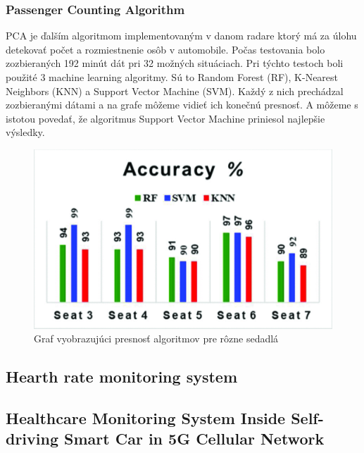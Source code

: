 \documentclass[10pt,oneside,slovak,a4paper]{article}
\begin{document}
\subsubsection{Passenger Counting Algorithm} \label{predstavenie:radar:pca}

PCA je ďalším algoritmom implementovaným v danom radare ktorý má za úlohu detekovať počet a rozmiestnenie osôb v automobile. Počas testovania bolo zozbieraných 192 minút dát pri 32 možných situáciach. Pri týchto testoch boli použité 3 machine learning algoritmy. Sú to Random Forest (RF), K-Nearest Neighbors (KNN) a Support Vector Machine (SVM). Každý z nich prechádzal zozbieranými dátami a na grafe môžeme vidieť ich konečnú presnosť. A môžeme s istotou povedať, že algoritmus Support Vector Machine priniesol najlepšie výsledky.

\begin {figure} [H]
\includegraphics[scale=0.5]{accuracy} 
\caption{Graf vyobrazujúci presnosť algoritmov pre rôzne sedadlá\cite{monitoring}}
\label{fig1}
\end {figure}

\subsection{Hearth rate monitoring system\cite{hearth}} \label{predstavenie:hearth}

\subsection{Healthcare Monitoring System Inside Self-driving Smart Car in 5G Cellular Network\cite{5g}}\label{predstavenie:5g}
\end{document}
